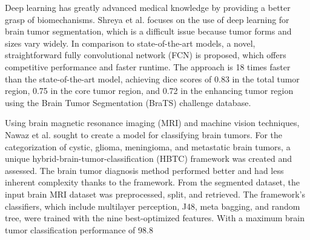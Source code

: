 \documentclass[twocolumn]{article}
\begin{document}
    
    Deep learning has greatly advanced medical knowledge by providing a better grasp of biomechanisms. Shreya et al. \cite{shreyas2017deep}  focuses on the use of deep learning for brain tumor segmentation, which is a difficult issue because tumor forms and sizes vary widely. In comparison to state-of-the-art models, a novel, straightforward fully convolutional network (FCN) is proposed, which offers competitive performance and faster runtime. The approach is 18 times faster than the state-of-the-art model, achieving dice scores of 0.83 in the total tumor region, 0.75 in the core tumor region, and 0.72 in the enhancing tumor region using the Brain Tumor Segmentation (BraTS) challenge database.

    Using brain magnetic resonance imaging (MRI) and machine vision techniques, Nawaz et al. \cite{nawaz2022brain} sought to create a model for classifying brain tumors. For the categorization of cystic, glioma, meningioma, and metastatic brain tumors, a unique hybrid-brain-tumor-classification (HBTC) framework was created and assessed. The brain tumor diagnosis method performed better and had less inherent complexity thanks to the framework. From the segmented dataset, the input brain MRI dataset was preprocessed, split, and retrieved. The framework's classifiers, which include multilayer perception, J48, meta bagging, and random tree, were trained with the nine best-optimized features. With a maximum brain tumor classification performance of 98.8%
    


 

\end{document}
